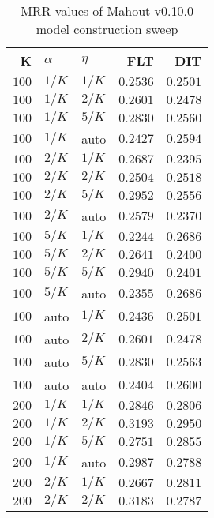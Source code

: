 
\begin{table}
\begin{spacing}{1.2}
\centering
\caption{MRR values of Mahout v0.10.0 model construction sweep}
\label{table:mahout_model_sweep}
\vspace{0.2em}
\parbox{.45\linewidth}{\centering \begin{tabular}{rll|rr}
\toprule
    K &  $\alpha$ &    $\eta$ & FLT &   DIT \\
\midrule
$100$ &  $1/K$ &  $1/K$ &         $0.2536$ & $0.2501$ \\
$100$ &  $1/K$ &  $2/K$ &         $0.2601$ & $0.2478$ \\
$100$ &  $1/K$ &  $5/K$ &         $0.2830$ & $0.2560$ \\
$100$ &  $1/K$ &   auto &         $0.2427$ & $0.2594$ \\
$100$ &  $2/K$ &  $1/K$ &         $0.2687$ & $0.2395$ \\
$100$ &  $2/K$ &  $2/K$ &         $0.2504$ & $0.2518$ \\
$100$ &  $2/K$ &  $5/K$ &         $0.2952$ & $0.2556$ \\
$100$ &  $2/K$ &   auto &         $0.2579$ & $0.2370$ \\
$100$ &  $5/K$ &  $1/K$ &         $0.2244$ & $0.2686$ \\
$100$ &  $5/K$ &  $2/K$ &         $0.2641$ & $0.2400$ \\
$100$ &  $5/K$ &  $5/K$ &         $0.2940$ & $0.2401$ \\
$100$ &  $5/K$ &   auto &         $0.2355$ & $0.2686$ \\
$100$ &   auto &  $1/K$ &         $0.2436$ & $0.2501$ \\
$100$ &   auto &  $2/K$ &         $0.2601$ & $0.2478$ \\
$100$ &   auto &  $5/K$ &         $0.2830$ & $0.2563$ \\
$100$ &   auto &   auto &         $0.2404$ & $0.2600$ \\
$200$ &  $1/K$ &  $1/K$ &         $0.2846$ & $0.2806$ \\
$200$ &  $1/K$ &  $2/K$ &         $0.3193$ & $0.2950$ \\
$200$ &  $1/K$ &  $5/K$ &         $0.2751$ & $0.2855$ \\
$200$ &  $1/K$ &   auto &         $0.2987$ & $0.2788$ \\
$200$ &  $2/K$ &  $1/K$ &         $0.2667$ & $0.2811$ \\
$200$ &  $2/K$ &  $2/K$ &         $0.3183$ & $0.2787$ \\

\end{tabular}}
\end{spacing}
\end{table}
